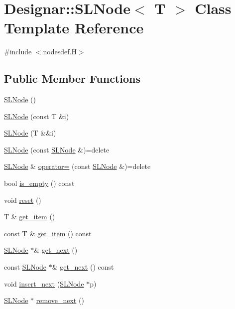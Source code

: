 \hypertarget{class_designar_1_1_s_l_node}{}\section{Designar\+:\+:S\+L\+Node$<$ T $>$ Class Template Reference}
\label{class_designar_1_1_s_l_node}


{\ttfamily \#include $<$nodesdef.\+H$>$}

\subsection*{Public Member Functions}
\begin{DoxyCompactItemize}
\item 
\hyperlink{class_designar_1_1_s_l_node_ae069c6940aaa2a34a513852f1c3bf3d3}{S\+L\+Node} ()
\item 
\hyperlink{class_designar_1_1_s_l_node_af9decf3a4e3809e98d0e9652295c9c1a}{S\+L\+Node} (const T \&i)
\item 
\hyperlink{class_designar_1_1_s_l_node_ab854d173d39d41bacee31e9c8f0862bf}{S\+L\+Node} (T \&\&i)
\item 
\hyperlink{class_designar_1_1_s_l_node_a29b970c1369f20fe8c783b66fb8490c1}{S\+L\+Node} (const \hyperlink{class_designar_1_1_s_l_node}{S\+L\+Node} \&)=delete
\item 
\hyperlink{class_designar_1_1_s_l_node}{S\+L\+Node} \& \hyperlink{class_designar_1_1_s_l_node_a0f721b1dd909cf847079ad14ca010bd0}{operator=} (const \hyperlink{class_designar_1_1_s_l_node}{S\+L\+Node} \&)=delete
\item 
bool \hyperlink{class_designar_1_1_s_l_node_a80728e8c780ed3854fa1b9fb84c201cc}{is\+\_\+empty} () const
\item 
void \hyperlink{class_designar_1_1_s_l_node_ad837fcbb2d5d1fb1c7aa51392f6fdaae}{reset} ()
\item 
T \& \hyperlink{class_designar_1_1_s_l_node_a8b1b374efe3c861930b24515fb15d243}{get\+\_\+item} ()
\item 
const T \& \hyperlink{class_designar_1_1_s_l_node_a3bda4e61a77ff2df2096850759605257}{get\+\_\+item} () const
\item 
\hyperlink{class_designar_1_1_s_l_node}{S\+L\+Node} $\ast$\& \hyperlink{class_designar_1_1_s_l_node_ab1b0be79e766dddc4a09d9ef9f2c5763}{get\+\_\+next} ()
\item 
const \hyperlink{class_designar_1_1_s_l_node}{S\+L\+Node} $\ast$\& \hyperlink{class_designar_1_1_s_l_node_af5e1695860968505290e42d16381508f}{get\+\_\+next} () const
\item 
void \hyperlink{class_designar_1_1_s_l_node_aa1c82417ecc20fca0808c955bca384f7}{insert\+\_\+next} (\hyperlink{class_designar_1_1_s_l_node}{S\+L\+Node} $\ast$p)
\item 
\hyperlink{class_designar_1_1_s_l_node}{S\+L\+Node} $\ast$ \hyperlink{class_designar_1_1_s_l_node_aa12ebd41228f87e9df06d5e74b7111e6}{remove\+\_\+next} ()
\end{DoxyCompactItemize}


